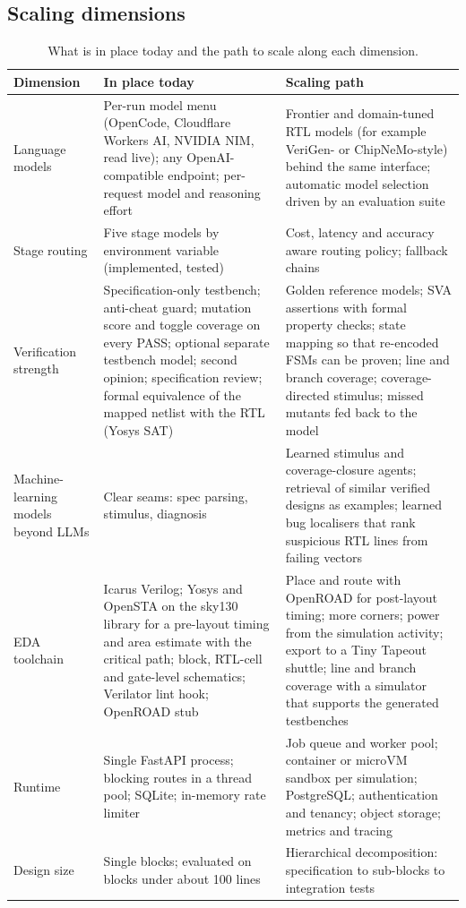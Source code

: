 \subsection{Scaling dimensions}
\begin{table}[H]
\centering
\caption{What is in place today and the path to scale along each dimension.}
\label{tab:scale}
\footnotesize
\begin{tabularx}{\textwidth}{@{}p{2.5cm}XX@{}}
\toprule
\textbf{Dimension} & \textbf{In place today} & \textbf{Scaling path} \\
\midrule
Language models & Per-run model menu (OpenCode, Cloudflare Workers AI, NVIDIA NIM, read live); any OpenAI-compatible endpoint; per-request model and reasoning effort & Frontier and domain-tuned RTL models (for example VeriGen- or ChipNeMo-style) behind the same interface; automatic model selection driven by an evaluation suite \\
Stage routing & Five stage models by environment variable (implemented, tested) & Cost, latency and accuracy aware routing policy; fallback chains \\
Verification strength & Specification-only testbench; anti-cheat guard; mutation score and toggle coverage on every PASS; optional separate testbench model; second opinion; specification review; formal equivalence of the mapped netlist with the RTL (Yosys SAT) & Golden reference models; SVA assertions with formal property checks; state mapping so that re-encoded FSMs can be proven; line and branch coverage; coverage-directed stimulus; missed mutants fed back to the model \\
Machine-learning models beyond LLMs & Clear seams: spec parsing, stimulus, diagnosis & Learned stimulus and coverage-closure agents; retrieval of similar verified designs as examples; learned bug localisers that rank suspicious RTL lines from failing vectors \\
EDA toolchain & Icarus Verilog; Yosys and OpenSTA on the sky130 library for a pre-layout timing and area estimate with the critical path; block, RTL-cell and gate-level schematics; Verilator lint hook; OpenROAD stub & Place and route with OpenROAD for post-layout timing; more corners; power from the simulation activity; export to a Tiny Tapeout shuttle; line and branch coverage with a simulator that supports the generated testbenches \\
Runtime & Single FastAPI process; blocking routes in a thread pool; SQLite; in-memory rate limiter & Job queue and worker pool; container or microVM sandbox per simulation; PostgreSQL; authentication and tenancy; object storage; metrics and tracing \\
Design size & Single blocks; evaluated on blocks under about 100 lines & Hierarchical decomposition: specification to sub-blocks to integration tests \\
\bottomrule
\end{tabularx}
\end{table}

